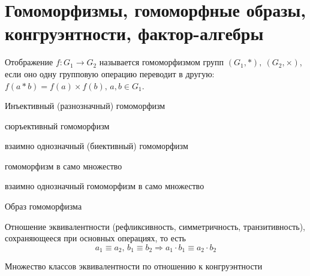 \documentclass[../main/document.tex]{subfiles}
\begin{document}
\section{Гомоморфизмы, гомоморфные образы,\\ конгруэнтности, фактор-алгебры}
\begin{dfn}[Гомоморфизм]\label{homomorphism}
Отображение $f \colon G_1 \to G_2$ называется гомоморфизмом групп $(G_1,*), ~(G_2,\times)$, если оно одну групповую операцию переводит в другую: $f(a*b)=f(a)\times f(b),\, a,b\in G_1$.
\end{dfn}
\begin{dfn}[Мономорфизм]
Инъективный (разнозначный) гомоморфизм
\end{dfn}
\begin{exm}

\end{exm}
\begin{dfn}[Эпиморфизм]
сюръективный гомоморфизм
\end{dfn}
\begin{exm}

\end{exm}
\begin{dfn}[Изоморфизм]
взаимно однозначный (биективный) гомоморфизм
\end{dfn}
\begin{exm}

\end{exm}
\begin{dfn}[Эндоморфизм]
гомоморфизм в само множество
\end{dfn}
\begin{exm}

\end{exm}
\begin{dfn}[Автоморфизм]
взаимно однозначный гомоморфизм в само множество
\end{dfn}
\begin{exm}

\end{exm}
\begin{dfn}
Образ гомоморфизма
\end{dfn}
\begin{exm}

\end{exm}
\begin{dfn}[Конгруэнтность]
Отношение эквивалентности (рефликсивность, симметричность, транзитивность), сохраняющееся при основных операциях, то есть 
$$a_1\equiv a_2,\, b_1\equiv b_2\Rightarrow a_1\cdot b_1\equiv a_2\cdot b_2$$
\end{dfn}
\begin{dfn}
Множество классов эквивалентности по отношению к конгруэнтности
\end{dfn}
\end{document}
